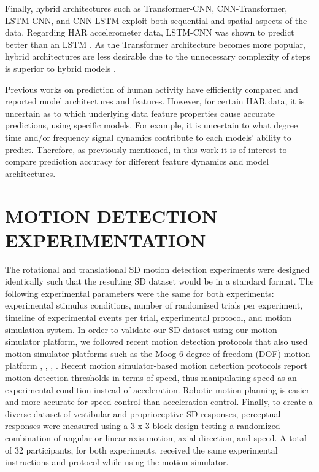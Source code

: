 \documentclass{ieeeaccess}
\begin{document}
Finally, hybrid architectures such as Transformer-CNN, CNN-Transformer, LSTM-CNN, and CNN-LSTM exploit both sequential and spatial aspects of the data. Regarding HAR accelerometer data, LSTM-CNN was shown to predict better than an LSTM \cite{Xia_2020_LSTMCNN}. As the Transformer architecture becomes more popular, hybrid architectures are less desirable due to the unnecessary complexity of steps is superior to hybrid models \cite{Dirgova_2022_Wearable}.

Previous works on prediction of human activity have efficiently compared and reported model architectures and features.  However, for certain HAR data, it is uncertain as to which underlying data feature properties cause accurate predictions, using specific models.  For example, it is uncertain to what degree time and/or frequency signal dynamics contribute to each models' ability to predict. Therefore, as previously mentioned, in this work it is of interest to compare prediction accuracy for different feature dynamics and model architectures.

\section{MOTION DETECTION EXPERIMENTATION}
The rotational and translational SD motion detection experiments were designed identically such that the resulting SD dataset would be in a standard format. The following experimental parameters were the same for both experiments: experimental stimulus conditions, number of randomized trials per experiment, timeline of experimental events per trial, experimental protocol, and motion simulation system. In order to validate our SD dataset using our motion simulator platform, we followed recent motion detection protocols that also used motion simulator platforms such as the Moog 6-degree-of-freedom (DOF) motion platform \cite{BermudezRey_2016_Vestibular}, \cite{Hartmann_2014_Direction}, \cite{Karmali_2017_Multivariate}, \cite{Valko_2012_Vestibular}. Recent motion simulator-based motion detection protocols report motion detection thresholds in terms of speed, thus manipulating speed as an experimental condition instead of acceleration. Robotic motion planning is easier and more accurate for speed control than acceleration control. Finally, to create a diverse dataset of vestibular and proprioceptive SD responses, perceptual responses were measured using a 3 x 3 block design testing a randomized combination of angular or linear axis motion, axial direction, and speed. A total of 32 participants, for both experiments, received the same experimental instructions and protocol while using the motion simulator.
\end{document}
